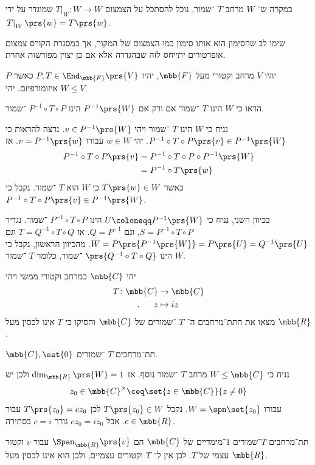 \documentclass[a4paper,10pt,twoside,openany]{book}
\begin{document}
\begin{definition}
במקרה ש־%
$W$
מרחב
$T$%
־שמור, נוכל להסתכל על הצמצום
$\left. T \right|_W \colon W \to W$
שמוגדר על ידי
$\left. T \right|_W \prs{w} = T\prs{w}$.
\end{definition}

\begin{remark}
שימו לב שהסימון הוא אותו סימון כמו הצמצום של המקור, אך במסגרת הקורס צמצום אופרטורים יתייחס לזה שבהגדרה אלא אם כן יצוין מפורשות אחרת.
\end{remark}

\begin{exercisechap}
יהיו
$V$
מרחב וקטורי
מעל
$\mbb{F}$,
יהיו
$P,T \in \End_{\mbb{F}}\prs{V}$
כאשר
$P$
איזומורפיזם.
יהי
$W \leq V$.

הראו כי
$W$
הינו
$T$%
־שמור אם ורק אם
$P^{-1}\prs{W}$
הינו
$P^{-1} \circ T \circ P$%
־שמור.
\end{exercisechap}

\begin{solution}
נניח כי
$W$
הינו
$T$%
־שמור ויהי
$v \in P^{-1}\prs{W}$.
נרצה להראות כי
$P^{-1} \circ T \circ P \prs{v} \in P^{-1}\prs{W}$.
יהי
$w \in W$
עבורו
$v = P^{-1}\prs{w}$.
אז
\begin{align*}
P^{-1} \circ T \circ P \prs{v} &= P^{-1} \circ T \circ P \circ P^{-1}\prs{W}
\\&= P^{-1} \circ T \prs{w}
\end{align*}
כאשר
$T\prs{w} \in W$
כי
$W$
הוא
$T$%
־שמור. נקבל כי
$P^{-1} \circ T \circ P \prs{v} \in P^{-1}\prs{W}$.

בכיוון השני, נניח כי
$U \coloneqq P^{-1}\prs{W}$
הינו
$P^{-1} \circ T \circ P$%
־שמור.
נגדיר
$S = P^{-1} \circ T \circ P$,
וגם
$Q = P^{-1}$.
אז
$T = Q^{-1} \circ T \circ Q$
וגם
$W = P\prs{P^{-1}\prs{W}} = P\prs{U} = Q^{-1}\prs{U}$.
מהכיוון הראשון, נקבל כי
$W$
הינו
$\prs{Q^{-1} \circ T \circ Q}$%
־שמור, כלומר
$T$%
־שמור.
\end{solution}

\begin{exercisechap}
יהי
$\mbb{C}$
כמרחב וקטורי ממשי ויהי
\begin{align*}
T \colon \mbb{C} &\to \mbb{C} \\
\text{.} \hphantom{lala} z &\mapsto iz
\end{align*}
מצאו את התת־מרחבים ה־%
$T$%
־שמורים של
$\mbb{C}$
והסיקו כי
$T$
אינו לכסין מעל
$\mbb{R}$.
\end{exercisechap}

\begin{solution}
$\mbb{C}, \set{0}$
תת־מרחבים
$T$%
־שמורים.

נניח כי
$W \leq \mbb{C}$
מרחב
$T$%
־שמור נוסף. אז
$\dim_{\mbb{R}}\prs{W} = 1$
ולכן יש
\[z_0 \in \mbb{C}^\times \ceq \set{z \in \mbb{C}}{z \neq 0}\]
עבורו
$W = \spn\set{z_0}$.
נקבל
$T\prs{z_0} \in W$
לכן
$T\prs{z_0} = c z_0$
עבור
$c \in \mbb{R}$.
אבל
$c z_0 = i z_0$
גורר
$c = i$
בסתירה.

תת־מרחבים $T$־שמורים $1$־מימדיים של
$\mbb{C}$
הם
$\Span_{\mbb{R}}\prs{v}$
עבור
$v$
וקטור עצמי של
$T$.
 לכן אין ל־%
$T$
וקטורים עצמיים, ולכן הוא אינו לכסין מעל
$\mbb{R}$.
\end{solution}
\end{document}
